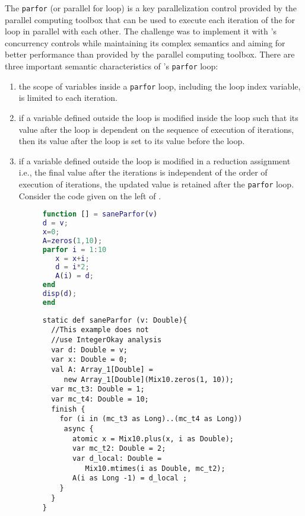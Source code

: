 The  \verb|parfor| (or parallel
for loop) is a key parallelization control provided by the
\matlab parallel computing toolbox that can be used to execute each
iteration of the for loop in parallel with each other. The challenge was
to implement it with \xten's concurrency controls while maintaining its
complex semantics and aiming for better performance than provided by the
parallel computing toolbox. 
There are three important semantic characteristics of \matlab's
\verb|parfor| loop: 
\begin{enumerate}
\item the scope of variables inside a \verb|parfor|
loop, including the loop index variable, is limited to each iteration.

\item if a variable defined outside the loop is modified inside the loop
such that its value after the loop is dependent on the sequence of
execution of iterations, then its value after the loop is set to its
value before the loop. 

\item if a variable defined outside the loop is
modified in a reduction assignment i.e., the final value after the
iterations is independent of the order of execution of iterations, the
updated value is retained after the \verb|parfor| loop. Consider the
\matlab code given on the left of .

\begin{figure}[htbp]
\begin{minipage}{0.3\linewidth}
\begin{lstlisting}[language=Matlab,numbers=none]                                
function [] = saneParfor(v)
d = v; 
x=0;
A=zeros(1,10);
parfor i = 1:10
   x = x+i;
   d = i*2;
   A(i) = d;
end
disp(d);
end
\end{lstlisting}  
\end{minipage}\hfill
\begin{minipage}{0.6\linewidth}
\begin{lstlisting}[language=X10,numbers=none]                                   
static def saneParfor (v: Double){ 
  //This example does not 
  //use IntegerOkay analysis
  var d: Double = v;
  var x: Double = 0;
  val A: Array_1[Double] = 
     new Array_1[Double](Mix10.zeros(1, 10));
  var mc_t3: Double = 1;
  var mc_t4: Double = 10;
  finish {
    for (i in (mc_t3 as Long)..(mc_t4 as Long))
     async {
       atomic x = Mix10.plus(x, i as Double);
       var mc_t2: Double = 2;
       var d_local: Double = 
          Mix10.mtimes(i as Double, mc_t2);
       A(i as Long -1) = d_local ;
    }
  }
}
\end{lstlisting}              
\end{minipage}


\end{figure}
\end{enumerate}
